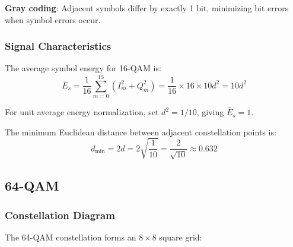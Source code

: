 \textbf{Gray coding}: Adjacent symbols differ by exactly 1 bit, minimizing bit errors when symbol errors occur.

\subsubsection{Signal Characteristics}

The average symbol energy for 16-QAM is:
\begin{equation}
\bar{E}_s = \frac{1}{16}\sum_{m=0}^{15} (I_m^2 + Q_m^2) = \frac{1}{16} \times 16 \times 10d^2 = 10d^2
\label{eq:16qam-energy}
\end{equation}

For unit average energy normalization, set $d^2 = 1/10$, giving $\bar{E}_s = 1$.

The minimum Euclidean distance between adjacent constellation points is:
\begin{equation}
d_{\min} = 2d = 2\sqrt{\frac{1}{10}} = \frac{2}{\sqrt{10}} \approx 0.632
\label{eq:16qam-distance}
\end{equation}

\subsection{64-QAM}

\subsubsection{Constellation Diagram}

The 64-QAM constellation forms an $8 \times 8$ square grid:

\begin{center}
\end{center}

